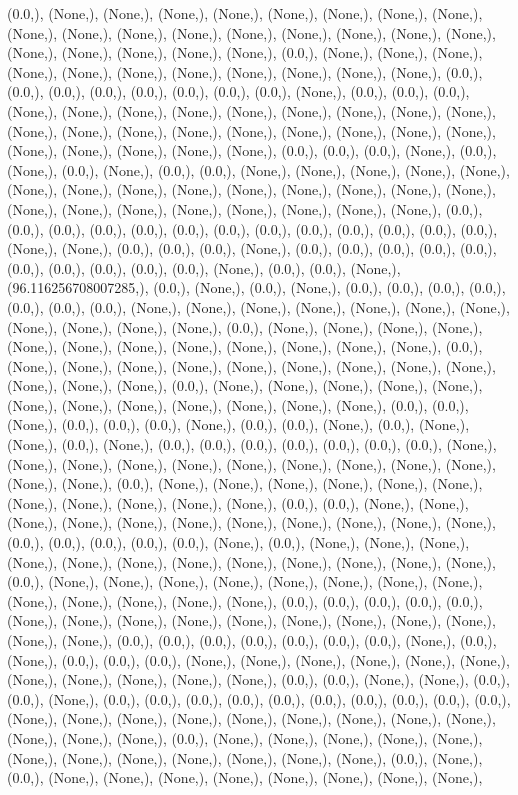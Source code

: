 \documentclass{article}
\begin{document}
(0.0,), (None,), (None,), (None,), (None,), (None,), (None,), (None,), (None,), (None,), (None,), (None,), (None,), (None,), (None,), (None,), (None,), (None,), (None,), (None,), (None,), (None,), (None,), (0.0,), (None,), (None,), (None,), (None,), (None,), (None,), (None,), (None,), (None,), (None,), (None,), (0.0,), (0.0,), (0.0,), (0.0,), (0.0,), (0.0,), (0.0,), (0.0,), (None,), (0.0,), (0.0,), (0.0,), (None,), (None,), (None,), (None,), (None,), (None,), (None,), (None,), (None,), (None,), (None,), (None,), (None,), (None,), (None,), (None,), (None,), (None,), (None,), (None,), (None,), (None,), (None,), (0.0,), (0.0,), (0.0,), (None,), (0.0,), (None,), (0.0,), (None,), (0.0,), (0.0,), (None,), (None,), (None,), (None,), (None,), (None,), (None,), (None,), (None,), (None,), (None,), (None,), (None,), (None,), (None,), (None,), (None,), (None,), (None,), (None,), (None,), (None,), (0.0,), (0.0,), (0.0,), (0.0,), (0.0,), (0.0,), (0.0,), (0.0,), (0.0,), (0.0,), (0.0,), (0.0,), (0.0,), (None,), (None,), (0.0,), (0.0,), (0.0,), (None,), (0.0,), (0.0,), (0.0,), (0.0,), (0.0,), (0.0,), (0.0,), (0.0,), (0.0,), (0.0,), (None,), (0.0,), (0.0,), (None,), (96.116256708007285,), (0.0,), (None,), (0.0,), (None,), (0.0,), (0.0,), (0.0,), (0.0,), (0.0,), (0.0,), (0.0,), (None,), (None,), (None,), (None,), (None,), (None,), (None,), (None,), (None,), (None,), (None,), (0.0,), (None,), (None,), (None,), (None,), (None,), (None,), (None,), (None,), (None,), (None,), (None,), (None,), (0.0,), (None,), (None,), (None,), (None,), (None,), (None,), (None,), (None,), (None,), (None,), (None,), (None,), (0.0,), (None,), (None,), (None,), (None,), (None,), (None,), (None,), (None,), (None,), (None,), (None,), (None,), (0.0,), (0.0,), (None,), (0.0,), (0.0,), (0.0,), (None,), (0.0,), (0.0,), (None,), (0.0,), (None,), (None,), (0.0,), (None,), (0.0,), (0.0,), (0.0,), (0.0,), (0.0,), (0.0,), (0.0,), (None,), (None,), (None,), (None,), (None,), (None,), (None,), (None,), (None,), (None,), (None,), (None,), (0.0,), (None,), (None,), (None,), (None,), (None,), (None,), (None,), (None,), (None,), (None,), (None,), (0.0,), (0.0,), (None,), (None,), (None,), (None,), (None,), (None,), (None,), (None,), (None,), (None,), (None,), (0.0,), (0.0,), (0.0,), (0.0,), (0.0,), (None,), (0.0,), (None,), (None,), (None,), (None,), (None,), (None,), (None,), (None,), (None,), (None,), (None,), (None,), (0.0,), (None,), (None,), (None,), (None,), (None,), (None,), (None,), (None,), (None,), (None,), (None,), (None,), (None,), (0.0,), (0.0,), (0.0,), (0.0,), (0.0,), (None,), (None,), (None,), (None,), (None,), (None,), (None,), (None,), (None,), (None,), (None,), (0.0,), (0.0,), (0.0,), (0.0,), (0.0,), (0.0,), (0.0,), (None,), (0.0,), (None,), (0.0,), (0.0,), (0.0,), (None,), (None,), (None,), (None,), (None,), (None,), (None,), (None,), (None,), (None,), (None,), (0.0,), (0.0,), (None,), (None,), (0.0,), (0.0,), (None,), (0.0,), (0.0,), (0.0,), (0.0,), (0.0,), (0.0,), (0.0,), (0.0,), (0.0,), (0.0,), (None,), (None,), (None,), (None,), (None,), (None,), (None,), (None,), (None,), (None,), (None,), (None,), (0.0,), (None,), (None,), (None,), (None,), (None,), (None,), (None,), (None,), (None,), (None,), (None,), (None,), (0.0,), (None,), (0.0,), (None,), (None,), (None,), (None,), (None,), (None,), (None,), (None,), 
\end{document}
